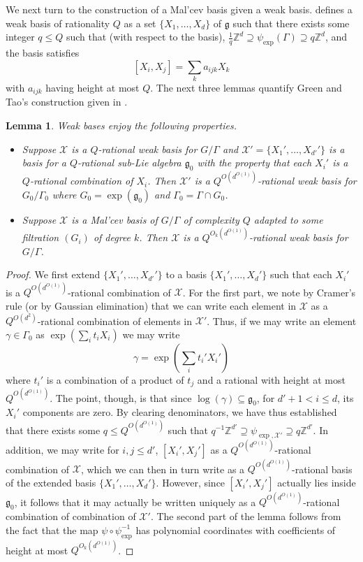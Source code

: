 \documentclass[11pt, a4paper]{amsart}
\theoremstyle{plain}
\theoremstyle{plain}
\newtheorem{lemma}{Lemma}
\theoremstyle{definition}
\theoremstyle{remark}
\numberwithin{equation}{section}
\numberwithin{lemma}{section}
\numberwithin{proposition}{section}
\numberwithin{corollary}{section}
\numberwithin{definition}{section}
\numberwithin{claim}{section}
\begin{document}
We next turn to the construction of a Mal'cev basis given a weak basis. \cite[Definition A.7]{GT12} defines a weak basis of rationality $Q$ as a set $\{X_1, \dots, X_d\}$ of $\mathfrak{g}$ such that there exists some integer $q \le Q$ such that (with respect to the basis), $\frac{1}{q} \mathbb{Z}^d \supseteq \psi_{\exp}(\Gamma) \supseteq q\mathbb{Z}^d$, and the basis satisfies 
$$[X_i, X_j] = \sum_{k} a_{ijk}X_k$$
with $a_{ijk}$ having height at most $Q$. The next three lemmas quantify Green and Tao's construction given in \cite[Lemma A.8, Proposition A.9--A.10]{GT12}.
\begin{lemma}\label{l:weakbases}
Weak bases enjoy the following properties.
\begin{itemize}
\item Suppose $\mathcal{X}$ is a $Q$-rational weak basis for $G/\Gamma$ and $\mathcal{X}' = \{X_1', \dots, X_{d'}'\}$ is a basis for a $Q$-rational sub-Lie algebra $\mathfrak{g}_0$ with the property that each $X_i'$ is a $Q$-rational combination of $X_i$. Then $\mathcal{X}'$ is a $Q^{O(d^{O(1)})}$-rational weak basis for $G_0/\Gamma_0$ where $G_0 = \exp(\mathfrak{g}_0)$ and $\Gamma_0 = \Gamma \cap G_0$.
\item Suppose $\mathcal{X}$ is a Mal'cev basis of $G/\Gamma$ of complexity $Q$ adapted to some filtration $(G_i)$ of degree $k$. Then $\mathcal{X}$ is a $Q^{O_k(d^{O(1)})}$-rational weak basis for $G/\Gamma$.
\end{itemize}
\end{lemma}
\begin{proof}
We first extend $\{X_1', \dots, X_{d'}'\}$ to a basis $\{X_1', \dots, X_{d}'\}$ such that each $X_i'$ is a $Q^{O(d^{O(1)})}$-rational combination of $\mathcal{X}$. For the first part, we note by Cramer's rule (or by Gaussian elimination) that we can write each element in $\mathcal{X}$ as a $Q^{O(d^2)}$-rational combination of elements in $\mathcal{X}'$. Thus, if we may write an element $\gamma \in \Gamma_0$ as $\exp(\sum_i t_i X_i)$ we may write
$$\gamma = \exp(\sum_i t_i' X_i')$$
where $t_i'$ is a combination of a product of $t_j$ and a rational with height at most $Q^{O(d^{O(1)})}$. The point, though, is that since $\log(\gamma) \subseteq \mathfrak{g}_0$, for $d' + 1 < i \le d$, its $X_i'$ components are zero. By clearing denominators, we have thus established that there exists some $q \le Q^{O(d^{O(1)})}$ such that $q^{-1}\mathbb{Z}^{d'} \supseteq \psi_{\exp, \mathcal{X}'} \supseteq q\mathbb{Z}^{d'}$. In addition, we may write for $i, j \le d'$, $[X_i', X_j']$ as a $Q^{O(d^{O(1)})}$-rational combination of $\mathcal{X}$, which we can then in turn write as a $Q^{O(d^{O(1)})}$-rational basis of the extended basis $\{X_1', \dots, X_d'\}$. However, since $[X_i', X_j']$ actually lies inside $\mathfrak{g}_0$, it follows that it may actually be written uniquely as a $Q^{O(d^{O(1)})}$-rational combination of combination of $\mathcal{X}'$. The second part of the lemma follows from the fact that the map $\psi \circ \psi_{\exp}^{-1}$ has polynomial coordinates with coefficients of height at most $Q^{O_k(d^{O(1)})}$.
\end{proof}
\end{document}
